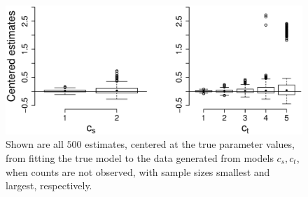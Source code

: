 \begin{figure}
  \centering
  \includegraphics[scale=0.5]{em_bp}
  \caption{Shown are all $500$ estimates, centered at the true parameter values, from fitting the true model to the data generated from models $c_s,c_t$, when counts are not observed, with sample sizes smallest and largest, respectively.}
  \label{fig:em_bp}
\end{figure}

